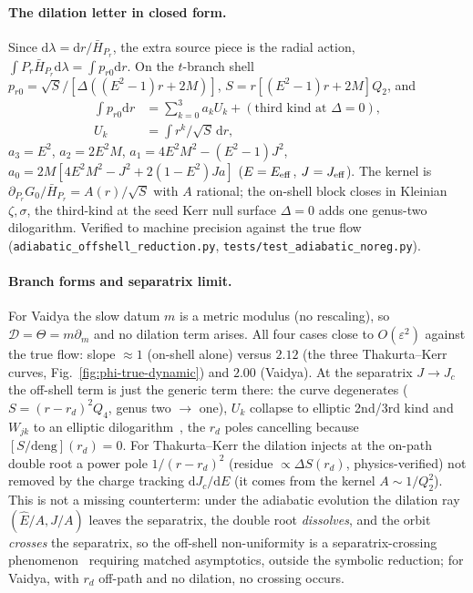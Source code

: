 \documentclass[
    aps, prd, twocolumn, superscriptaddress,
    showpacs, nofootinbib, floatfix
]{revtex4-2}
\newcommand{\Ehat}{\hat E}
\newcommand{\Jc}{J_{c}}
\newcommand{\dd}{\mathrm{d}}
\begin{document}
\paragraph{The dilation letter in closed form.}
Since $\dd\lambda=\dd r/\bar H_{P_r}$, the extra source piece is the radial action,
$\int P_r\bar H_{P_r}\dd\lambda=\int p_{r0}\dd r$. On the $t$-branch shell
$p_{r0}=\sqrt S/[\Delta((E^2-1)r+2M)]$, $S=r[(E^2-1)r+2M]Q_2$, and
\begin{equation}
\begin{split}
    \int p_{r0}\dd r&=\sum_{k=0}^3 a_k U_k+(\text{third kind at }\Delta=0),\\
    U_k&=\int r^k/\sqrt S\,\dd r,
\end{split}
\end{equation}
$a_3=E^2$, $a_2=2E^2M$, $a_1=4E^2M^2-(E^2-1)J^2$, $a_0=2M[4E^2M^2-J^2+2(1-E^2)Ja]$
($E=E_{\rm eff}$, $J=J_{\rm eff}$). The kernel is $\partial_{P_r}G_0/\bar
H_{P_r}=A(r)/\sqrt S$ with $A$ rational; the on-shell block closes in Kleinian
$\zeta,\sigma$, the third-kind at the seed Kerr null surface $\Delta=0$ adds one
genus-two dilogarithm. Verified to machine precision against the true flow
(\texttt{adiabatic\_offshell\_reduction.py}, \texttt{tests/test\_adiabatic\_noreg.py}).

\paragraph{Branch forms and separatrix limit.}
For Vaidya the slow datum $m$ is a metric modulus (no rescaling), so
$\mathcal D=\Theta=m\partial_m$ and no dilation term arises. All four cases close to
$O(\varepsilon^2)$ against the true flow: slope $\approx1$ (on-shell alone) versus
$2.12$ (the three Thakurta--Kerr curves, Fig.~\ref{fig:phi-true-dynamic}) and
$2.00$ (Vaidya). At the separatrix $J\to\Jc$ the off-shell term is just the generic term
there: the curve degenerates ($S=(r-r_d)^2Q_4$, genus two $\to$ one), $U_k$ collapse to
elliptic 2nd/3rd kind and $W_{jk}$ to an elliptic dilogarithm~\cite{BrownLevin2011}, the
$r_d$ poles cancelling because $[S/\text{deng}](r_d)=0$. For Thakurta--Kerr the dilation
injects at the on-path double root a power pole $1/(r-r_d)^2$ (residue
$\propto\Delta S(r_d)$, physics-verified) not removed by the charge tracking $\dd J_c/\dd E$
(it comes from the kernel $A\sim1/Q_2^2$). This is not a missing counterterm: under the
adiabatic evolution the dilation ray $(\Ehat/A,J/A)$ leaves the separatrix, the double root
\emph{dissolves}, and the orbit \emph{crosses} the separatrix, so the off-shell
non-uniformity is a separatrix-crossing phenomenon~\cite{Neishtadt1987,Neishtadt2013}
requiring matched asymptotics, outside the symbolic reduction; for Vaidya, with $r_d$
off-path and no dilation, no crossing occurs.
\end{document}
